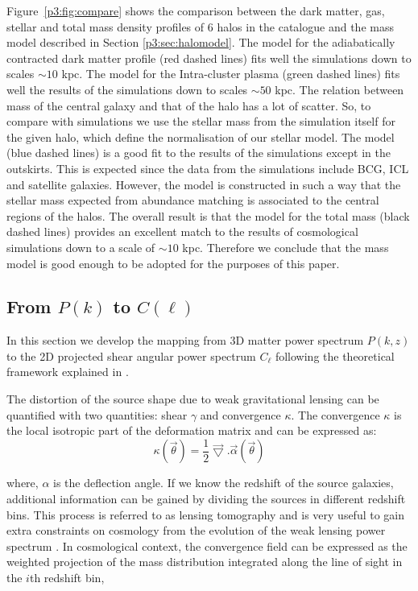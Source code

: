 \documentclass[
  11pt,
  twoside,
  openright,
  titlepage,
  headings=optiontoheadandtoc
]{scrbook}
\begin{document}
Figure~\ref{p3:fig:compare} shows the comparison between the dark matter, gas, stellar and total mass density profiles of 6 halos in the \cite{2014MNRAS.440.2290M} catalogue and the mass model described in Section \ref{p3:sec:halomodel}. The model for the adiabatically contracted dark matter profile (red dashed lines) fits well the simulations down to scales $\sim 10$ kpc. The model for the Intra-cluster plasma (green dashed lines) fits well the results of the simulations down to scales $\sim 50$ kpc. The relation between mass of the central galaxy and that of the halo has a lot of scatter. So, to compare with simulations we use the stellar mass from the simulation itself for the given halo, which define the normalisation of our stellar model. The model (blue dashed lines) is a good fit to the results of the simulations except in the outskirts. This is expected since the data from the simulations include BCG, ICL and satellite galaxies. However, the model is constructed in such a way that the stellar mass expected from abundance matching is associated to the central regions of the halos. The overall result is that the model for the total mass (black dashed lines) provides an excellent match to the results of cosmological simulations down to a scale of $\sim 10$ kpc. Therefore we conclude that the mass model is good enough to be adopted for the purposes of this paper.




\subsection{From \texorpdfstring{$P(k)$}{P(k)} to \texorpdfstring{$C(\ell)$}{C(ell)}}
\label{p3:sec:pk2cl}
In this section we develop the mapping from 3D matter power spectrum $P(k,z)$ to the 2D projected shear angular power spectrum $C_{\ell}$ following the theoretical framework explained in \cite{2009MNRAS.395.2065T}.

The distortion of the source shape due to weak gravitational lensing can be quantified with two quantities: shear $\gamma$ and convergence $\kappa$. The convergence $\kappa$ is the local isotropic part of the deformation matrix and can be expressed as:
\begin{equation}
	\kappa(\vec{\theta}) = \dfrac{1}{2} \vec{\bigtriangledown}.\vec{\alpha}(\vec{\theta})
\end{equation}

where, $\alpha$ is the deflection angle. If we know the redshift of the source galaxies, additional information can be gained by dividing the sources in different redshift bins. This process is referred to as lensing tomography and is very useful to gain extra constraints on cosmology from the evolution of the weak lensing power spectrum \citep{1999ApJ...522L..21H, 2002PhRvD..65f3001H, 2004MNRAS.348..897T}. In cosmological context, the convergence field can be expressed as the weighted projection of the mass distribution integrated along the line of sight in the $i$th redshift bin, 
\end{document}
